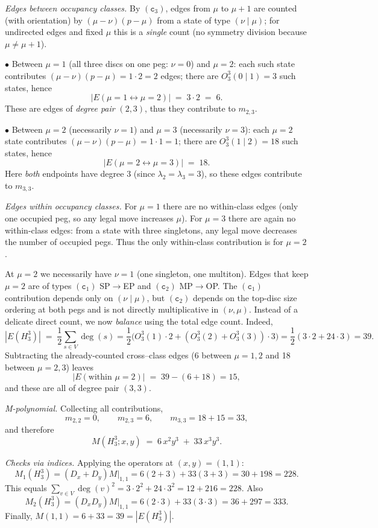 \documentclass[letterpaper,12pt]{article}
\begin{document}
\emph{Edges between occupancy classes.}
By $(\texttt{c}_{3})$, edges from $\mu$ to $\mu+1$ are counted (with orientation) by
$(\mu-\nu)(p-\mu)$ from a state of type $(\nu\mid\mu)$; for undirected edges and fixed
$\mu$ this is a \emph{single} count (no symmetry division because $\mu\neq \mu+1$).

\smallskip
\noindent
$\bullet$ Between $\mu=1$ (all three discs on one peg: $\nu=0$) and $\mu=2$:
each such state contributes $(\mu-\nu)(p-\mu)=1\cdot 2=2$ edges; there are $O_3^3(0\mid 1)=3$
such states, hence
\[
|E(\mu=1\leftrightarrow \mu=2)| \;=\; 3\cdot 2 \;=\; 6.
\]
These are edges of \emph{degree pair} $(2,3)$, thus they contribute to $m_{2,3}$.

\smallskip
\noindent
$\bullet$ Between $\mu=2$ (necessarily $\nu=1$) and $\mu=3$ (necessarily $\nu=3$):
each $\mu=2$ state contributes $(\mu-\nu)(p-\mu)=1\cdot 1=1$; there are $O_3^3(1\mid 2)=18$
such states, hence
\[
|E(\mu=2\leftrightarrow \mu=3)| \;=\; 18.
\]
Here \emph{both} endpoints have degree $3$ (since $\lambda_2=\lambda_3=3$), so these edges
contribute to $m_{3,3}$.

\emph{Edges within occupancy classes.}
For $\mu=1$ there are no within-class edges (only one occupied peg, so any legal move
increases $\mu$). For $\mu=3$ there are again no within-class edges:
from a state with three singletons, any legal move decreases the number of occupied pegs.
Thus the only within-class contribution is for $\mu=2$.

At $\mu=2$ we necessarily have $\nu=1$ (one singleton, one multiton). Edges that keep $\mu=2$
are of types $(\texttt{c}_{1})$ SP$\to$EP and $(\texttt{c}_{2})$ MP$\to$OP. The $(\texttt{c}_{1})$ contribution depends only on
$(\nu\mid\mu)$, but $(\texttt{c}_{2})$ depends on the top-disc size ordering at both pegs and is not
directly multiplicative in $(\nu,\mu)$.
Instead of a delicate direct count, we now \emph{balance} using the total edge count. Indeed,
\[
|E(H_3^3)| \;=\; \frac12\sum_{s\in V}\deg(s)
= \frac12\big( O_3^3(1)\cdot 2 + (O_3^3(2)+O_3^3(3))\cdot 3\big)
=\frac12(3\cdot 2 + 24\cdot 3)=39.
\]
Subtracting the already-counted cross–class edges (6 between $\mu=1,2$ and 18 between
$\mu=2,3$) leaves
\[
|E(\text{within }\mu=2)| \;=\; 39-(6+18)=15,
\]
and these are all of degree pair $(3,3)$.

\emph{M-polynomial.}
Collecting all contributions,
\[
m_{2,2}=0,\qquad m_{2,3}=6,\qquad m_{3,3}=18+15=33,
\]
and therefore
\[
M(H_3^3;x,y)\;=\;6\,x^2y^3\;+\;33\,x^3y^3.
\]

\emph{Checks via indices.}
Applying the operators at $(x,y)=(1,1)$:
\[
M_1(H_3^3)=(D_x+D_y)M\big|_{1,1}
=6(2+3)+33(3+3)=30+198=228.
\]
This equals $\sum_{v\in V}\deg(v)^2=3\cdot 2^2+24\cdot 3^2=12+216=228$.
Also
\[
M_2(H_3^3)=(D_xD_y)M\big|_{1,1}=6(2\cdot 3)+33(3\cdot 3)=36+297=333.
\]
Finally, $M(1,1)=6+33=39=|E(H_3^3)|$.
\end{document}
